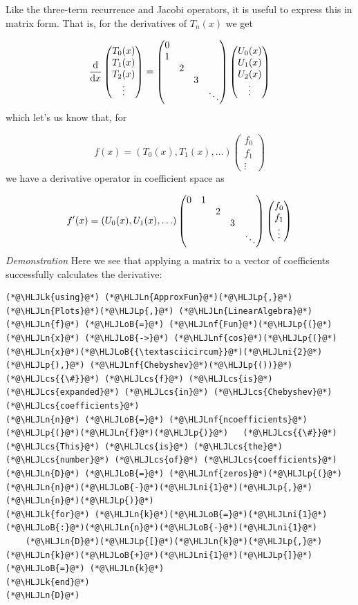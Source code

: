 \documentclass[12pt,a4paper]{article}
\newcommand{\HLJLk}[1]{\textcolor[RGB]{148,91,176}{\textbf{#1}}}
\newcommand{\HLJLn}[1]{#1}
\newcommand{\HLJLnf}[1]{\textcolor[RGB]{66,102,213}{#1}}
\newcommand{\HLJLni}[1]{\textcolor[RGB]{59,151,46}{#1}}
\newcommand{\HLJLoB}[1]{\textcolor[RGB]{102,102,102}{\textbf{#1}}}
\newcommand{\HLJLp}[1]{#1}
\newcommand{\HLJLcs}[1]{\textcolor[RGB]{153,153,119}{\textit{#1}}}
\def\D{ {\rm d} }
\def\dx{\D x}
\begin{document}
Like the three-term recurrence and Jacobi operators, it is useful to express this in matrix form. That is, for the derivatives of $T_n(x)$ we get

\[
{\D \over \dx}  \begin{pmatrix} T_0(x) \\ T_1(x) \\ T_2(x) \\ \vdots \end{pmatrix}= \begin{pmatrix}
0 \cr
1 \cr 
& 2 \cr
&& 3 \cr
&&&\ddots 
\end{pmatrix} \begin{pmatrix} U_0(x) \\ U_1(x) \\ U_2(x) \\ \vdots \end{pmatrix} 
\]
which let's us know that, for 

\[
f(x) = (T_0(x),T_1(x),\ldots) \begin{pmatrix} f_0\\f_1\\\vdots \end{pmatrix}
\]
we have a derivative operator in coefficient space as

\[
f'(x) = (U_0(x),U_1(x),\ldots)\begin{pmatrix}
0 & 1 \cr 
&& 2 \cr
&&& 3 \cr
&&&&\ddots 
\end{pmatrix}  \begin{pmatrix} f_0\\f_1\\\vdots \end{pmatrix}
\]
\emph{Demonstration} Here we see that applying a matrix to a vector of coefficients successfully calculates the derivative:


\begin{lstlisting}
(*@\HLJLk{using}@*) (*@\HLJLn{ApproxFun}@*)(*@\HLJLp{,}@*) (*@\HLJLn{Plots}@*)(*@\HLJLp{,}@*) (*@\HLJLn{LinearAlgebra}@*)
(*@\HLJLn{f}@*) (*@\HLJLoB{=}@*) (*@\HLJLnf{Fun}@*)(*@\HLJLp{(}@*)(*@\HLJLn{x}@*) (*@\HLJLoB{->}@*) (*@\HLJLnf{cos}@*)(*@\HLJLp{(}@*)(*@\HLJLn{x}@*)(*@\HLJLoB{{\textasciicircum}}@*)(*@\HLJLni{2}@*)(*@\HLJLp{),}@*) (*@\HLJLnf{Chebyshev}@*)(*@\HLJLp{())}@*)   (*@\HLJLcs{{\#}}@*) (*@\HLJLcs{f}@*) (*@\HLJLcs{is}@*) (*@\HLJLcs{expanded}@*) (*@\HLJLcs{in}@*) (*@\HLJLcs{Chebyshev}@*) (*@\HLJLcs{coefficients}@*)
(*@\HLJLn{n}@*) (*@\HLJLoB{=}@*) (*@\HLJLnf{ncoefficients}@*)(*@\HLJLp{(}@*)(*@\HLJLn{f}@*)(*@\HLJLp{)}@*)   (*@\HLJLcs{{\#}}@*) (*@\HLJLcs{This}@*) (*@\HLJLcs{is}@*) (*@\HLJLcs{the}@*) (*@\HLJLcs{number}@*) (*@\HLJLcs{of}@*) (*@\HLJLcs{coefficients}@*)
(*@\HLJLn{D}@*) (*@\HLJLoB{=}@*) (*@\HLJLnf{zeros}@*)(*@\HLJLp{(}@*)(*@\HLJLn{n}@*)(*@\HLJLoB{-}@*)(*@\HLJLni{1}@*)(*@\HLJLp{,}@*)(*@\HLJLn{n}@*)(*@\HLJLp{)}@*)
(*@\HLJLk{for}@*) (*@\HLJLn{k}@*)(*@\HLJLoB{=}@*)(*@\HLJLni{1}@*)(*@\HLJLoB{:}@*)(*@\HLJLn{n}@*)(*@\HLJLoB{-}@*)(*@\HLJLni{1}@*)
    (*@\HLJLn{D}@*)(*@\HLJLp{[}@*)(*@\HLJLn{k}@*)(*@\HLJLp{,}@*)(*@\HLJLn{k}@*)(*@\HLJLoB{+}@*)(*@\HLJLni{1}@*)(*@\HLJLp{]}@*) (*@\HLJLoB{=}@*) (*@\HLJLn{k}@*)
(*@\HLJLk{end}@*)
(*@\HLJLn{D}@*)
\end{lstlisting}
\end{document}
